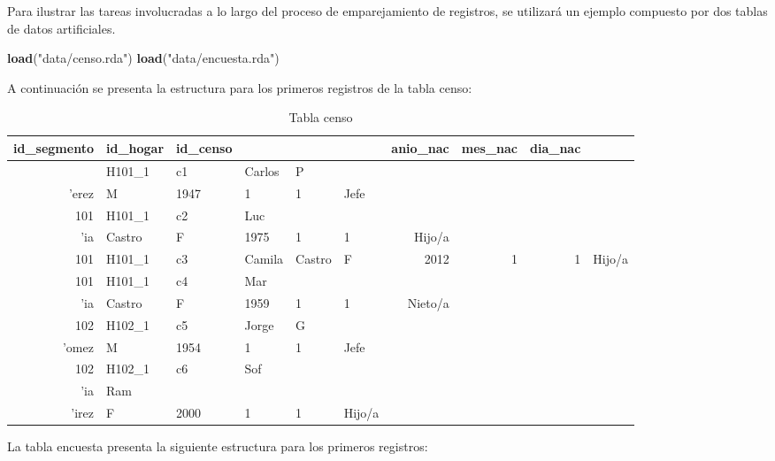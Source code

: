 \documentclass[
  12pt,
]{book}
\newenvironment{Shaded}{\begin{snugshade}}{\end{snugshade}}
\newcommand{\FunctionTok}[1]{\textcolor[rgb]{0.13,0.29,0.53}{\textbf{#1}}}
\newcommand{\NormalTok}[1]{#1}
\newcommand{\StringTok}[1]{\textcolor[rgb]{0.31,0.60,0.02}{#1}}
\begin{document}
Para ilustrar las tareas involucradas a lo largo del proceso de emparejamiento de registros, se utilizará un ejemplo compuesto por dos tablas de datos artificiales.

\begin{Shaded}
\begin{Highlighting}[]
\FunctionTok{load}\NormalTok{(}\StringTok{"data/censo.rda"}\NormalTok{)}
\FunctionTok{load}\NormalTok{(}\StringTok{"data/encuesta.rda"}\NormalTok{)}
\end{Highlighting}
\end{Shaded}

A continuación se presenta la estructura para los primeros registros de la tabla censo:

\begin{table}[t]
\caption*{
{\fontsize{20}{25}\selectfont  Tabla censo\fontsize{12}{15}\selectfont }
} 
\fontsize{12.0pt}{14.0pt}\selectfont
\begin{tabular*}{\linewidth}{@{\extracolsep{\fill}}rlllllrrrl}
\toprule
id\_segmento & id\_hogar & id\_censo & {\bfseries \cellcolor[HTML]{F9F9F9}{nombre}} & {\bfseries \cellcolor[HTML]{F9F9F9}{apellido}} & {\bfseries \cellcolor[HTML]{F9F9F9}{sexo}} & anio\_nac & mes\_nac & dia\_nac & {\bfseries \cellcolor[HTML]{F9F9F9}{parentesco}} \\ 
\midrule\addlinespace[2.5pt]
101 & H101\_1 & c1 & Carlos & P\\'erez & M & 1947 & 1 & 1 & Jefe \\ 
101 & H101\_1 & c2 & Luc\\'ia & Castro & F & 1975 & 1 & 1 & Hijo/a \\ 
101 & H101\_1 & c3 & Camila & Castro & F & 2012 & 1 & 1 & Hijo/a \\ 
101 & H101\_1 & c4 & Mar\\'ia & Castro & F & 1959 & 1 & 1 & Nieto/a \\ 
102 & H102\_1 & c5 & Jorge & G\\'omez & M & 1954 & 1 & 1 & Jefe \\ 
102 & H102\_1 & c6 & Sof\\'ia & Ram\\'irez & F & 2000 & 1 & 1 & Hijo/a \\ 
\bottomrule
\end{tabular*}
\end{table}

La tabla encuesta presenta la siguiente estructura para los primeros registros:
\end{document}
